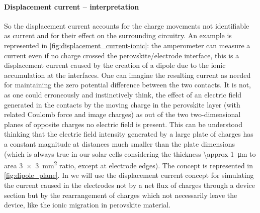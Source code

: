 		\paragraph{Displacement current -- interpretation}
		So the displacement current accounts for the charge movements not identifiable as current and for their effect on the surrounding circuitry.
		An example is represented in \cref{fig:displacement_current-ionic}: the amperometer can measure a current even if no charge crossed the perovskite/electrode interface, this is a displacement current caused by the creation of a dipole due to the ionic accumulation at the interfaces.
		One can imagine the resulting current as needed for maintaining the zero potential difference between the two contacts.
		It is not, as one could erroneously and instinctively think, the effect of an electric field generated in the contacts by the moving charge in the perovskite layer (with related Coulomb force and image charges) as out of the two two-dimensional planes of opposite charges no electric field is present.
		This can be understood thinking that the electric field intensity generated by a large plate of charges has a constant magnitude at distances much smaller than the plate dimensions (which is always true in our solar cells considering the thickness \SI{\approx 1}{\um} to area \SI{3x3}{\square\mm} ratio, except at electrode edges).
		The concept is represented in \cref{fig:dipole_plane}.
		In  we will use the displacement current concept for simulating the current caused in the electrodes not by a net flux of charges through a device section but by the rearrangement of charges which not necessarily leave the device, like the ionic migration in perovskite material.

		\begin{figure}
		\end{figure}

